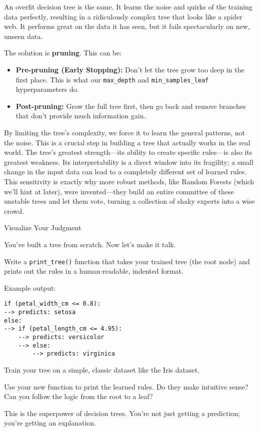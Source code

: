 \documentclass[11pt, letterpaper, openany]{book}
\begin{document}
An overfit decision tree is the same. It learns the noise and quirks of the training data perfectly, resulting in a ridiculously complex tree that looks like a spider web. It performs great on the data it has seen, but it fails spectacularly on new, unseen data.

The solution is \textbf{pruning}. This can be:
\begin{itemize}
    \item \textbf{Pre-pruning (Early Stopping):} Don't let the tree grow too deep in the first place. This is what our \texttt{max\_depth} and \texttt{min\_samples\_leaf} hyperparameters do.
    \item \textbf{Post-pruning:} Grow the full tree first, then go back and remove branches that don't provide much information gain.
\end{itemize}

By limiting the tree's complexity, we force it to learn the general patterns, not the noise. This is a crucial step in building a tree that actually works in the real world. The tree's greatest strength—its ability to create specific rules—is also its greatest weakness. Its interpretability is a direct window into its fragility; a small change in the input data can lead to a completely different set of learned rules. This sensitivity is exactly why more robust methods, like Random Forests (which we'll hint at later), were invented—they build an entire committee of these unstable trees and let them vote, turning a collection of shaky experts into a wise crowd.

\begin{challengebox}
Visualize Your Judgment

You've built a tree from scratch. Now let's make it talk.

Write a \texttt{print\_tree()} function that takes your trained tree (the root node) and prints out the rules in a human-readable, indented format.

Example output:
\begin{verbatim}
if (petal_width_cm <= 0.8):
--> predicts: setosa
else:
--> if (petal_length_cm <= 4.95):
    --> predicts: versicolor
    --> else:
        --> predicts: virginica
\end{verbatim}

Train your tree on a simple, classic dataset like the Iris dataset.

Use your new function to print the learned rules. Do they make intuitive sense? Can you follow the logic from the root to a leaf?

This is the superpower of decision trees. You're not just getting a prediction; you're getting an explanation.
\end{challengebox}
\end{document}
